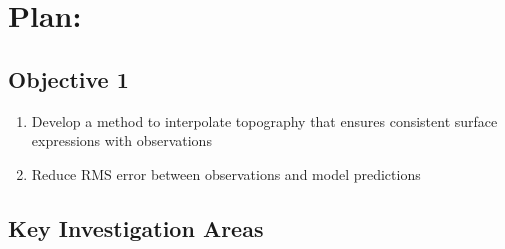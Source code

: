 \section*{Plan:}
\subsection*{Objective 1}
\begin{enumerate}
\item Develop a method to interpolate topography that ensures consistent surface expressions with observations
\item Reduce RMS error between observations and model predictions
\end{enumerate}
\subsection*{Key Investigation Areas}

